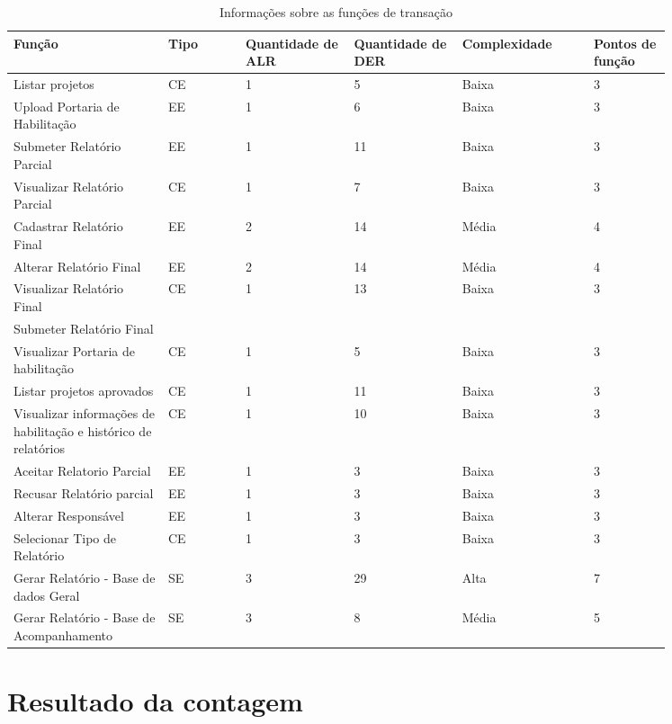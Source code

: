	\begin{table*}[!h]
	\centering
	\caption{Informações sobre as funções de transação}
	\label{funcoes_transacao}
	  \begin{tabular}{p{0.20\linewidth}p{0.10\linewidth}p{0.14\linewidth}p{0.14\linewidth}p{0.17\linewidth}p{0.10\linewidth}}
	\hline
	\textbf{Função} & \textbf{Tipo} & \textbf{Quantidade de ALR} & \textbf{Quantidade de DER} & \textbf{Complexidade} & \textbf{Pontos de função} \\
	\hline
	Listar projetos & CE & 1 & 5 & Baixa & 3 \\
	\hline
	Upload Portaria de Habilitação & EE & 1 & 6 & Baixa & 3 \\
	\hline
	Submeter Relatório Parcial & EE & 1 & 11 & Baixa & 3 \\
	\hline
	Visualizar Relatório Parcial & CE & 1 & 7 & Baixa & 3 \\
	\hline
	Cadastrar Relatório Final & EE & 2 & 14 & Média & 4 \\
	\hline
	Alterar Relatório Final & EE & 2 & 14 & Média & 4 \\
	\hline
	Visualizar Relatório Final & CE & 1 & 13 & Baixa & 3 \\
	\hline
	Submeter Relatório Final &  &  &  &  &  \\
	\hline
	Visualizar Portaria de habilitação & CE & 1 & 5 & Baixa & 3 \\
	\hline
	Listar projetos aprovados & CE & 1 & 11 & Baixa & 3 \\
	\hline
	Visualizar informações de habilitação e histórico de relatórios & CE & 1 & 10 & Baixa & 3 \\
	\hline
	Aceitar Relatorio Parcial & EE & 1 & 3 & Baixa & 3 \\
	\hline
	Recusar Relatório parcial & EE & 1 & 3 & Baixa & 3\\
	\hline
	Alterar Responsável & EE & 1 & 3 & Baixa & 3\\
	\hline
	Selecionar Tipo de Relatório & CE& 1 & 3 & Baixa & 3\\
	\hline
	Gerar Relatório - Base de dados Geral & SE& 3 & 29 & Alta & 7\\
	\hline
	Gerar Relatório - Base de Acompanhamento & SE& 3 & 8 & Média & 5\\
	\hline
	\end{tabular}
	\end{table*}

\vfill
\pagebreak
\section{Resultado da contagem}

